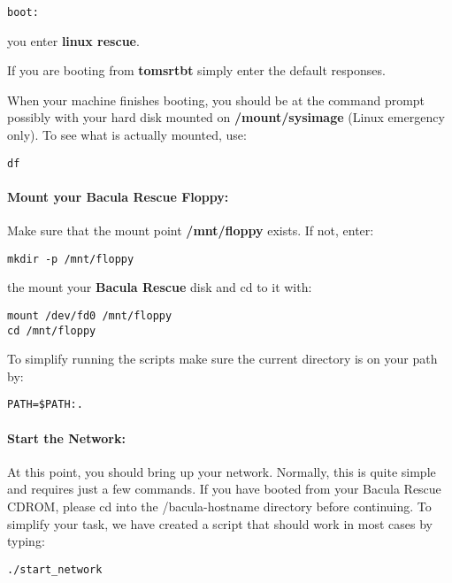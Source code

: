 \footnotesize
\begin{verbatim}
boot:
\end{verbatim}
\normalsize

you enter {\bf linux rescue}. 

If you are booting from {\bf tomsrtbt} simply enter the default responses. 

When your machine finishes booting, you should be at the command prompt
possibly with your hard disk mounted on {\bf /mount/sysimage} (Linux emergency
only). To see what is actually mounted, use: 

\footnotesize
\begin{verbatim}
df
\end{verbatim}
\normalsize

\paragraph*{Mount your Bacula Rescue Floppy:}

Make sure that the mount point {\bf /mnt/floppy} exists. If not, enter: 

\footnotesize
\begin{verbatim}
mkdir -p /mnt/floppy
\end{verbatim}
\normalsize

the mount your {\bf Bacula Rescue} disk and cd to it with: 

\footnotesize
\begin{verbatim}
mount /dev/fd0 /mnt/floppy
cd /mnt/floppy
\end{verbatim}
\normalsize

To simplify running the scripts make sure the current directory is on your
path by: 

\footnotesize
\begin{verbatim}
PATH=$PATH:.
\end{verbatim}
\normalsize

\paragraph*{Start the Network:}

At this point, you should bring up your network. Normally, this is quite
simple and requires just a few commands. If you have booted from your Bacula
Rescue CDROM, please cd into the /bacula-hostname directory before continuing.
To simplify your task, we have created a script that should work in most cases
by typing: 

\footnotesize
\begin{verbatim}
./start_network
\end{verbatim}
\normalsize

